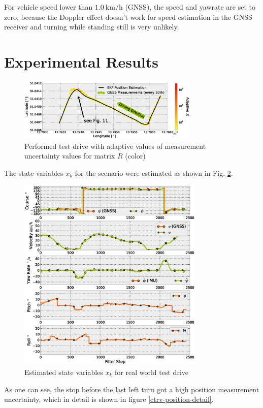 \documentclass[conference]{IEEEtran}
\begin{document}
For vehicle speed lower than $\SI{1,0}{\kilo\metre\per\hour}$ (GNSS), the speed and yawrate are set to zero, because the Doppler effect doesn't work for speed estimation in the GNSS receiver and turning while standing still is very unlikely.

\section{Experimental Results}

\begin{figure}[h!]
\centering
\includegraphics[width=3.4in]{images/Extended-Kalman-Filter-CTRV-Position}
\caption{Performed test drive with adaptive values of measurement uncertainty values for matrix $R$ (color)}
\label{ctrv-position}
\end{figure}

The state variables $x_k$ for the scenario were estimated as shown in Fig. \ref{ctrv-states}.

\begin{figure}[ht]
\centering
\includegraphics[width=3.5in]{images/Extended-Kalman-Filter-CTRV-Attitude-State-Estimates}
\caption{Estimated state variables $x_k$ for real world test drive}
\label{ctrv-states}
\end{figure}

As one can see, the stop before the last left turn got a high position measurement uncertainty, which in detail is shown in figure \ref{ctrv-position-detail}.
\end{document}

